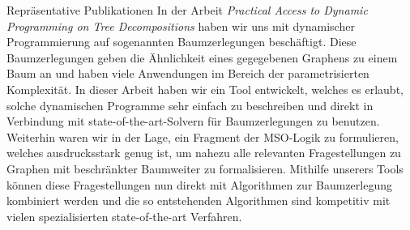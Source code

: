 \begin{rubric}{Repräsentative Publikationen}
  \entry*[ESA 2018] In der Arbeit \emph{Practical Access to Dynamic Programming on Tree Decompositions} haben wir uns mit dynamischer Programmierung auf sogenannten Baumzerlegungen beschäftigt. Diese Baumzerlegungen geben die Ähnlichkeit eines gegegebenen Graphens zu einem Baum an und haben viele Anwendungen im Bereich der parametrisierten Komplexität. In dieser Arbeit haben wir ein Tool entwickelt, welches es erlaubt, solche dynamischen Programme sehr einfach zu beschreiben und direkt in Verbindung mit state-of-the-art-Solvern für Baumzerlegungen zu benutzen. Weiterhin waren wir in der Lage, ein Fragment der MSO-Logik zu formulieren, welches ausdrucksstark genug ist, um nahezu alle relevanten Fragestellungen zu Graphen mit beschränkter Baumweiter zu formalisieren. Mithilfe unserers Tools können diese Fragestellungen nun direkt mit Algorithmen zur Baumzerlegung kombiniert werden und die so entstehenden Algorithmen sind kompetitiv mit vielen spezialisierten state-of-the-art Verfahren. 




\end{rubric}
